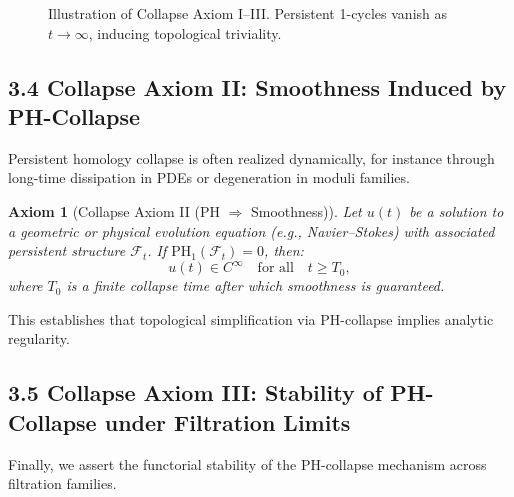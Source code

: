 \documentclass[11pt]{article}
\newtheorem{axiom}{Axiom}[section]
\begin{document}
\begin{figure}[h]
\centering
{}
\caption{Illustration of Collapse Axiom I–III. Persistent 1-cycles vanish as $t \to \infty$, inducing topological triviality.}
\end{figure}

\subsection*{3.4 Collapse Axiom II: Smoothness Induced by PH-Collapse}

Persistent homology collapse is often realized dynamically, for instance through long-time dissipation in PDEs or degeneration in moduli families.

\begin{axiom}[Collapse Axiom II (PH $\Rightarrow$ Smoothness)]
Let \( u(t) \) be a solution to a geometric or physical evolution equation (e.g., Navier–Stokes) with associated persistent structure \( \mathcal{F}_t \).  
If \( \mathrm{PH}_1(\mathcal{F}_t) = 0 \), then:
\[
u(t) \in C^\infty \quad \text{for all} \quad t \geq T_0,
\]
where \( T_0 \) is a finite collapse time after which smoothness is guaranteed.
\end{axiom}

This establishes that topological simplification via PH-collapse implies analytic regularity.

\subsection*{3.5 Collapse Axiom III: Stability of PH-Collapse under Filtration Limits}

Finally, we assert the functorial stability of the PH-collapse mechanism across filtration families.
\end{document}
